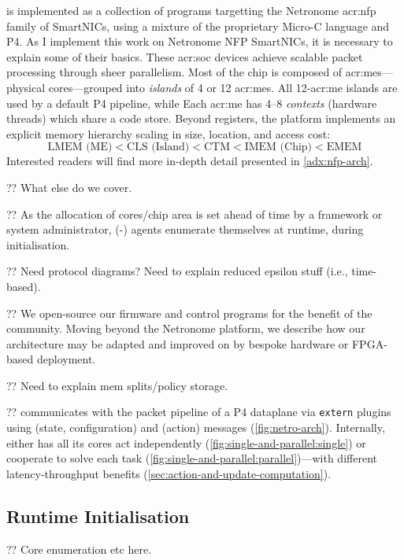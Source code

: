 \approachshort{} is implemented as a collection of programs targetting the Netronome \gls{acr:nfp} family of SmartNICs, using a mixture of the proprietary Micro-C language and P4.
As I implement this work on Netronome NFP SmartNICs, it is necessary to explain some of their basics.
These \gls{acr:soc} devices achieve scalable packet processing through sheer parallelism.
Most of the chip is composed of \glspl{acr:me}---physical cores---grouped into \emph{islands} of 4 or 12 \glspl{acr:me}.
All 12-\gls{acr:me} islands are used by a default P4 pipeline, while 
Each \gls{acr:me} has \numrange{4}{8} \emph{contexts} (hardware threads) which share a code store.
Beyond registers, the platform implements an explicit memory hierarchy scaling in size, location, and access cost:
$$\text{LMEM (ME)} < \text{CLS (Island)} < \text{CTM} < \text{IMEM (Chip)} < \text{EMEM}$$
Interested readers will find more in-depth detail presented in \cref{adx:nfp-arch}.

?? What else do we cover.

?? As the allocation of cores/chip area is set ahead of time by a framework or system administrator, \approachshort{}(-\Coopfw) agents enumerate themselves at runtime, during initialisation.

?? Need protocol diagrams? Need to explain reduced epsilon stuff (i.e., time-based).

?? We open-source our firmware and control programs for the benefit of the community.
Moving beyond the Netronome platform, we describe how our architecture may be adapted and improved on by bespoke hardware or FPGA-based deployment.

?? Need to explain mem splits/policy storage.

?? \approachshort{} communicates with the packet pipeline of a P4 dataplane via \texttt{extern} plugins using \inring{} (state, configuration) and \outring{} (action) messages (\cref{fig:netro-arch}).
Internally, \approachshort{} either has all its cores act independently (\cref{fig:single-and-parallel:single}) or cooperate to solve each task (\cref{fig:single-and-parallel:parallel})---with different latency-throughput benefits (\cref{sec:action-and-update-computation}).

\subsection{Runtime Initialisation}
?? Core enumeration etc here.

